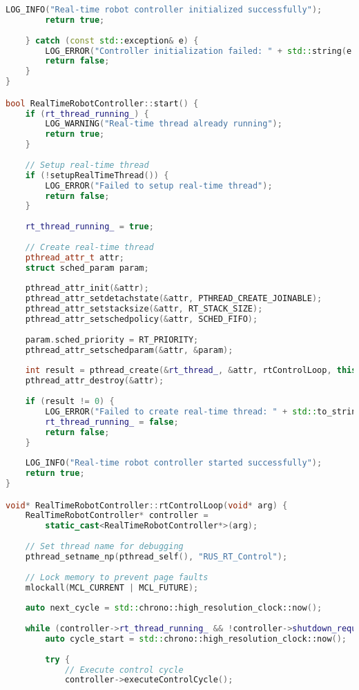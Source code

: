 \begin{lstlisting}[language=C++, caption={Real-Time Robot Controller}, label={lst:app-realtime-controller}]
        LOG_INFO("Real-time robot controller initialized successfully");
        return true;
        
    } catch (const std::exception& e) {
        LOG_ERROR("Controller initialization failed: " + std::string(e.what()));
        return false;
    }
}

bool RealTimeRobotController::start() {
    if (rt_thread_running_) {
        LOG_WARNING("Real-time thread already running");
        return true;
    }
    
    // Setup real-time thread
    if (!setupRealTimeThread()) {
        LOG_ERROR("Failed to setup real-time thread");
        return false;
    }
    
    rt_thread_running_ = true;
    
    // Create real-time thread
    pthread_attr_t attr;
    struct sched_param param;
    
    pthread_attr_init(&attr);
    pthread_attr_setdetachstate(&attr, PTHREAD_CREATE_JOINABLE);
    pthread_attr_setstacksize(&attr, RT_STACK_SIZE);
    pthread_attr_setschedpolicy(&attr, SCHED_FIFO);
    
    param.sched_priority = RT_PRIORITY;
    pthread_attr_setschedparam(&attr, &param);
    
    int result = pthread_create(&rt_thread_, &attr, rtControlLoop, this);
    pthread_attr_destroy(&attr);
    
    if (result != 0) {
        LOG_ERROR("Failed to create real-time thread: " + std::to_string(result));
        rt_thread_running_ = false;
        return false;
    }
    
    LOG_INFO("Real-time robot controller started successfully");
    return true;
}

void* RealTimeRobotController::rtControlLoop(void* arg) {
    RealTimeRobotController* controller = 
        static_cast<RealTimeRobotController*>(arg);
    
    // Set thread name for debugging
    pthread_setname_np(pthread_self(), "RUS_RT_Control");
    
    // Lock memory to prevent page faults
    mlockall(MCL_CURRENT | MCL_FUTURE);
    
    auto next_cycle = std::chrono::high_resolution_clock::now();
    
    while (controller->rt_thread_running_ && !controller->shutdown_requested_) {
        auto cycle_start = std::chrono::high_resolution_clock::now();
        
        try {
            // Execute control cycle
            controller->executeControlCycle();
            

\end{lstlisting}
